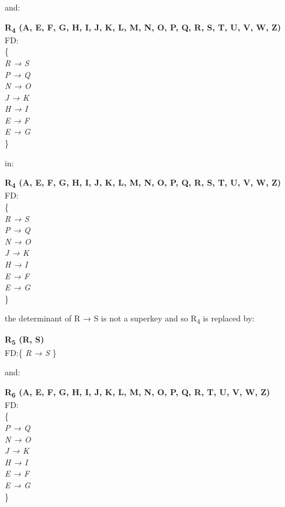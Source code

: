 and:\\

\begin{adjustwidth}{2cm}{}
\textbf{R\textsubscript{4} (A, E, F, G, H, I, J, K, L, M, N, O, P, Q, R, S, T, U, V, W, Z)}\\
FD:\\ 
\{\\ 
\textit{ 
R → S\\
P → Q\\
N → O\\
J → K\\
H → I\\
E → F\\
E → G\\
} 
\}\\
\end{adjustwidth} 

in:\\

\begin{adjustwidth}{2cm}{}
\textbf{R\textsubscript{4} (A, E, F, G, H, I, J, K, L, M, N, O, P, Q, R, S, T, U, V, W, Z)}\\
FD:\\ \{\\ 
\textit{ 
R → S\\
P → Q\\
N → O\\
J → K\\
H → I\\
E → F\\
E → G\\
} 
\}\\
\end{adjustwidth} 

the determinant of R → S is not a superkey and so R\textsubscript{4} is replaced by:\\

\begin{adjustwidth}{2cm}{}
\textbf{R\textsubscript{5} (R, S)}\\
FD:\{
\textit{ 
R → S 
}
\} \\
\end{adjustwidth} 

and:\\

\begin{adjustwidth}{2cm}{}
\textbf{R\textsubscript{6} (A, E, F, G, H, I, J, K, L, M, N, O, P, Q, R, T, U, V, W, Z)}\\
FD:\\
\{\\
\textit{ 
P → Q\\
N → O\\
J → K\\
H → I\\
E → F\\
E → G \\
}
\} \\
\end{adjustwidth}

